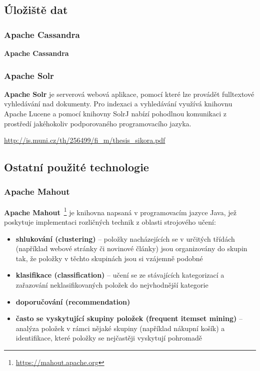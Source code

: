 \documentclass[thesis=M,czech]{FITthesis}[2014/05/07]
\begin{document}
\subsection{Úložiště dat}

\subsubsection{Apache Cassandra}
\textbf{Apache Cassandra}


\subsubsection{Apache Solr}
\textbf{Apache Solr} je serverová webová aplikace, pomocí které lze provádět fulltextové vyhledávání nad dokumenty. Pro indexaci a vyhledávání využívá knihovnu Apache Lucene a pomocí knihovny SolrJ nabízí pohodlnou komunikaci z prostředí jakéhokoliv podporovaného programovacího jazyka. 

\url{http://is.muni.cz/th/256499/fi_m/thesis_sikora.pdf}

\subsection{Ostatní použité technologie}

\subsubsection{Apache Mahout}
\textbf{Apache Mahout}~\footnote{\url{https://mahout.apache.org}} je knihovna napsaná v programovacím jazyce Java, jež poskytuje implementaci rozličných technik z oblasti strojového učení:

\begin{itemize}
	\item \textbf{shlukování (clustering)} – položky nacházejících se v určitých třídách (například webové stránky či novinové články) jsou organizovány do skupin tak, že položky v těchto skupinách jsou si vzájemně podobné
	\item \textbf{klasifikace (classification)} – učení se ze stávajících kategorizací a zařazování neklasifikovaných položek do nejvhodnější kategorie
	\item \textbf{doporučování (recommendation)}
	\item \textbf{často se vyskytující skupiny položek (frequent itemset mining)} – analýza položek v rámci nějaké skupiny (například nákupní košík) a identifikace, které položky se nejčastěji vyskytují pohromadě
\end{itemize}
\end{document}
